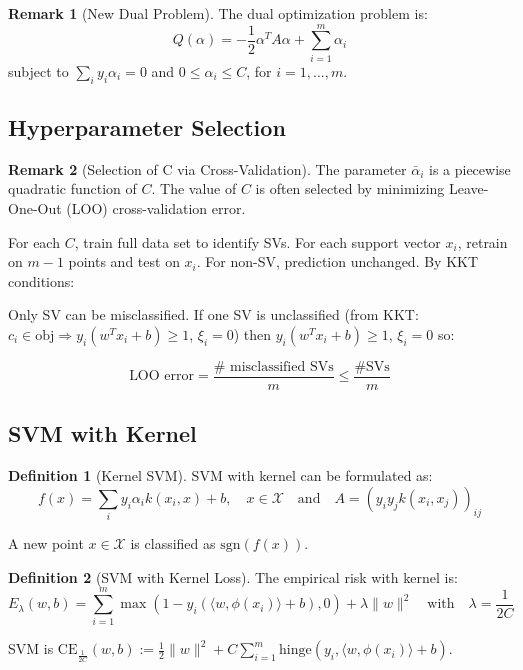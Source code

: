 \documentclass[12pt,a4paper]{article}
\theoremstyle{definition}
\newtheorem{definition}{Definition}[section]
\newtheorem{remark}{Remark}[section]
\begin{document}
\begin{remark}[New Dual Problem]
The dual optimization problem is:
\[
Q(\alpha) = -\frac{1}{2} \alpha^T A \alpha + \sum_{i=1}^m \alpha_i
\]
subject to $\sum_i y_i \alpha_i = 0$ and $0 \leq \alpha_i \leq C$, for $i = 1, \ldots, m$.
\end{remark}

\subsection{Hyperparameter Selection}

\begin{remark}[Selection of C via Cross-Validation]
The parameter $\bar{\alpha}_i$ is a piecewise quadratic function of $C$. The value of $C$ is often selected by minimizing Leave-One-Out (LOO) cross-validation error.

For each $C$, train full data set to identify SVs. For each support vector $x_i$, retrain on $m-1$ points and test on $x_i$. For non-SV, prediction unchanged. By KKT conditions:

Only SV can be misclassified. If one SV is unclassified (from KKT: $c_i \in \text{obj} \Rightarrow y_i(w^T x_i + b) \geq 1$, $\xi_i = 0$) then $y_i(w^T x_i + b) \geq 1$, $\xi_i = 0$ so:

\[
\text{LOO error} = \frac{\#\text{ misclassified SVs}}{m} \leq \frac{\#\text{SVs}}{m}
\]
\end{remark}

\subsection{SVM with Kernel}

\begin{definition}[Kernel SVM]
SVM with kernel can be formulated as:
\[
f(x) = \sum_i y_i \alpha_i k(x_i, x) + b, \quad x \in \mathcal{X} \quad \text{and} \quad A = (y_i y_j k(x_i, x_j))_{ij}
\]

A new point $x \in \mathcal{X}$ is classified as $\text{sgn}(f(x))$.
\end{definition}

\begin{definition}[SVM with Kernel Loss]
The empirical risk with kernel is:
\[
E_\lambda(w,b) = \sum_{i=1}^m \max(1 - y_i(\langle w, \phi(x_i) \rangle + b), 0) + \lambda \|w\|^2 \quad \text{with} \quad \lambda = \frac{1}{2C}
\]

SVM is $\text{CE}_{\frac{1}{2C}}(w,b) := \frac{1}{2}\|w\|^2 + C \sum_{i=1}^m \text{hinge}(y_i, \langle w, \phi(x_i) \rangle + b)$.
\end{definition}
\end{document}

